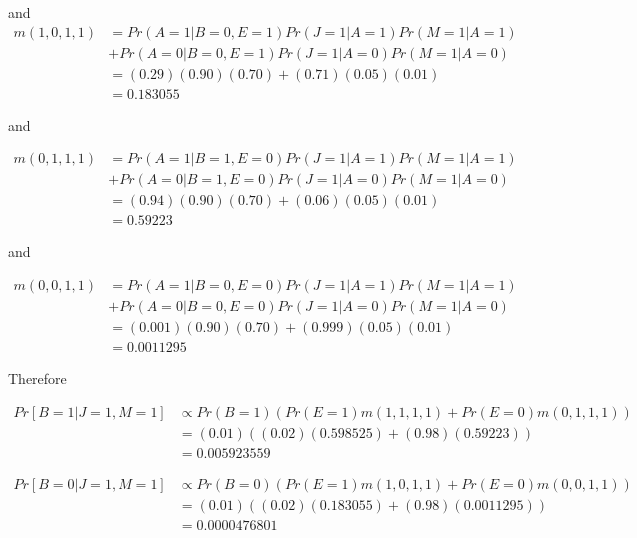 \documentclass{article}
\begin{document}
and 
\begin{equation}\begin{split}
m(1, 0, 1, 1) &= Pr(A=1|B=0, E=1)Pr(J=1|A=1)Pr(M=1|A=1) \\ & + Pr(A=0|B=0, E=1)Pr(J=1|A=0)Pr(M=1|A=0) \\
& = (0.29)(0.90)(0.70) + (0.71)(0.05)(0.01)\\
& = 0.183055
\end{split}
\end{equation}

and 

\begin{equation}\begin{split}
m(0, 1, 1, 1) &= Pr(A=1|B=1, E=0)Pr(J=1|A=1)Pr(M=1|A=1) \\
& + Pr(A=0|B=1, E=0)Pr(J=1|A=0)Pr(M=1|A=0) \\
& = (0.94)(0.90)(0.70) + (0.06)(0.05)(0.01)\\
& = 0.59223
\end{split}
\end{equation}

and 

\begin{equation}\begin{split}
m(0, 0, 1, 1) &= Pr(A=1|B=0, E=0)Pr(J=1|A=1)Pr(M=1|A=1) \\
& + Pr(A=0|B=0, E=0)Pr(J=1|A=0)Pr(M=1|A=0) \\
& = (0.001)(0.90)(0.70) + (0.999)(0.05)(0.01)\\
& = 0.0011295
\end{split}
\end{equation}

Therefore

\begin{equation}
\begin{split}
Pr[B=1|J=1, M=1] & \propto Pr(B=1)\left(Pr(E=1)m(1,1,1,1)  + Pr(E=0)m(0,1,1,1)\right) \\
&= (0.01) \left((0.02)(0.598525) + (0.98)(0.59223) \right)\\
& = 0.005923559
\end{split}
\end{equation}

\begin{equation}
\begin{split}
Pr[B=0|J=1, M=1] & \propto Pr(B=0)\left(Pr(E=1)m(1,0,1,1)  + Pr(E=0)m(0,0,1,1)\right) \\
&= (0.01) \left((0.02)(0.183055) + (0.98)(0.0011295) \right)\\
& = 0.0000476801
\end{split}
\end{equation}
\end{document}
